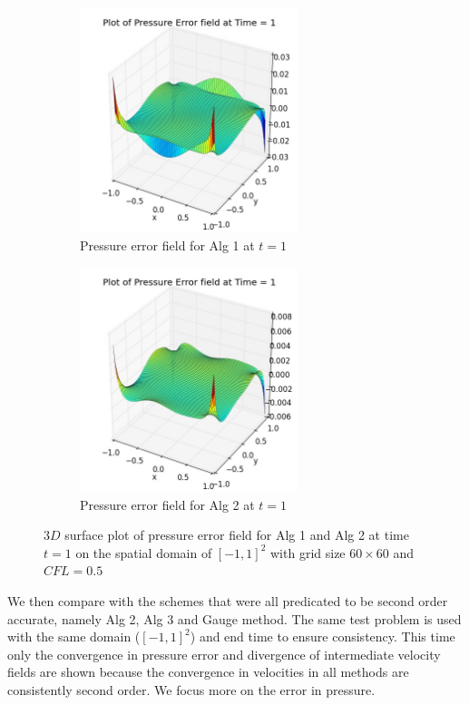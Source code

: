 \begin{figure}[H]
	\centering
	\begin{subfigure}[t]{2.5in}
		\centering
		\includegraphics[width=2.5in]{figures/Pm1a_pf2_P_error_t_1_grid_60_cfl_0_1.jpg}
		\caption{Pressure error field for Alg 1 at $t=1$ }\label{fig:6.2a}		
	\end{subfigure}
	\quad
	\begin{subfigure}[t]{2.5in}
		\centering
		\includegraphics[width=2.5in]{figures/Pm1b_pf2_P_error_t_1_grid_60_cfl_0_1.jpg}
		\caption{Pressure error field for Alg 2 at $t=1$}\label{fig:6.2b}
	\end{subfigure}
	\caption{$3D$ surface plot of pressure error field for Alg 1 and Alg 2 at time $t=1$ on the spatial domain of $[-1,1]^2$ with grid size $60 \times 60$ and $CFL=0.5$}\label{fig:6.2}
\end{figure}

We then compare with the schemes that were all predicated to be second order accurate, namely Alg 2, Alg 3 and Gauge method. The same test problem is used with the same domain ($[-1,1]^2$) and end time to ensure consistency. This time only the convergence in pressure error and divergence of intermediate velocity fields are shown because the convergence in velocities in all methods are consistently second order. We focus more on the error in pressure.\\

